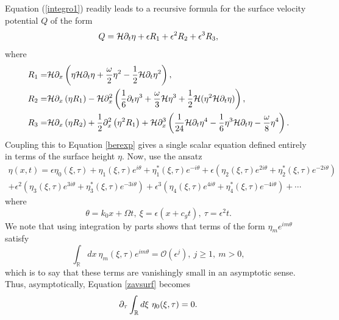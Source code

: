 \documentclass{JFM_Style/jfm}
\begin{document}
Equation (\ref{integro1}) readily leads to a recursive formula for the surface velocity potential $Q$ of the form
\begin{equation}
Q = \mathcal{H}\partial_{t}\eta + \epsilon R_{1} + \epsilon^{2} R_{2} + \epsilon^{3} R_{3},
\label{Qexp}
\end{equation}
where
\begin{align*}
R_{1}= & \mathcal{H}\partial_{x}\left(\eta\mathcal{H}\partial_{t}\eta+ \frac{\omega}{2}\eta^{2} - \frac{1}{2}\mathcal{H}\partial_{t}\eta^{2} \right),\\
R_{2}= & \mathcal{H}\partial_{x}\left(\eta R_{1} \right) - \mathcal{H}\partial_{x}^{2}\left(\frac{1}{6}\partial_{t}\eta^{3} + \frac{\omega}{3}\mathcal{H}\eta^{3} + \frac{1}{2}\mathcal{H}(\eta^{2}\mathcal{H}\partial_{t}\eta)\right),\\
R_{3} = & \mathcal{H}\partial_{x}\left(\eta R_{2} \right) + \frac{1}{2}\partial_{x}^{2}\left(\eta^{2}R_{1}\right) + \mathcal{H}\partial_{x}^{3}\left(\frac{1}{24}\mathcal{H}\partial_{t}\eta^{4} - \frac{1}{6}\eta^{3}\mathcal{H}\partial_{t}\eta - \frac{\omega}{8}\eta^{4}\right).
\end{align*}
Coupling this to Equation \eqref{berexp} gives a single scalar equation defined entirely in terms of the surface height $\eta$.  Now, use the ansatz
\begin{multline}
\eta(x,t) = \epsilon \eta_{0}(\xi,\tau) + \eta_{1}(\xi,\tau)e^{i\theta} +  \eta_{1}^{\ast}(\xi,\tau)e^{-i\theta} + \epsilon\left(\eta_{2}(\xi,\tau)e^{2i\theta} +  \eta_{2}^{\ast}(\xi,\tau)e^{-2i\theta}\right) \\
+ \epsilon^{2}\left(\eta_{3}(\xi,\tau)e^{3i\theta} +  \eta_{3}^{\ast}(\xi,\tau)e^{-3i\theta}\right)  + \epsilon^{3}\left(\eta_{4}(\xi,\tau)e^{4i\theta} +  \eta_{4}^{\ast}(\xi,\tau)e^{-4i\theta}\right) + \cdots
\label{nlssurfexp}
\end{multline}
where
\begin{equation}
\theta = k_{0}x + \Omega t, ~ \xi = \epsilon(x + c_{g}t), ~ \tau = \epsilon^{2}t.
\label{xidef}
\end{equation}
We note that using integration by parts shows that terms of the form $\eta_{m}e^{im\theta}$ satisfy 
\[
\int_{\mathbb{R}} dx ~ \eta_{m}(\xi,\tau) e^{im\theta}  = \mathcal{O}(\epsilon^{j}), ~ j\geq 1,~ m>0,
\]
which is to say that these terms are vanishingly small in an asymptotic sense.  Thus, asymptotically, Equation \eqref{zavsurf} becomes
\begin{equation}
\partial_{\tau}\int_{\mathbb{R}} d\xi ~ \eta_{0}(\xi,\tau) = 0.
\label{zavzmean}
\end{equation}
\end{document}

